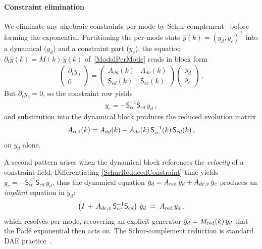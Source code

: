 \paragraph*{Constraint elimination}
We eliminate any algebraic constraints per mode by Schur complement~\cite{boydvandenberghe2004convex} before
forming the exponential. Partitioning the per-mode state
$\hat y(k) = (y_d, y_c)^{\mathsf{T}}$ into a dynamical ($y_d$) and
a constraint part ($y_c$), the equation
$\partial_t \hat y(k) = M(k)\, \hat y(k)$ of~\cref{ModalPerMode} reads
in block form
\begin{align}
  \begin{pmatrix} \partial_t y_d \\ 0 \end{pmatrix}
  = \begin{pmatrix} A_{dd}(k) & A_{dc}(k) \\
    \mathsf{S}_{cd}(k) & \mathsf{S}_{cc}(k) \end{pmatrix}
    \begin{pmatrix} y_d \\ y_c \end{pmatrix}
  \, .
  \label{ModalSchur}
\end{align}
But $\partial_t y_c = 0$, so the constraint row yields
\begin{align}
  y_c = -\mathsf{S}_{cc}^{-1} \mathsf{S}_{cd}\, y_d
  \, ,
  \label{SchurReducedConstraint}
\end{align}
and substitution into the dynamical block produces the reduced
evolution matrix
\begin{align}
  A_{\rm red}(k) = A_{dd}(k) - A_{dc}(k)\, \mathsf{S}_{cc}^{-1}(k)\, \mathsf{S}_{cd}(k)
  \, ,
  \label{SchurReducedMatrix}
\end{align}
on $y_d$ alone.%

A second pattern arises when the dynamical block references the
\emph{velocity} of a constraint field. Differentiating
\cref{SchurReducedConstraint} \wrt time yields
$\dot y_c = -\mathsf{S}_{cc}^{-1}\mathsf{S}_{cd}\,\dot y_d$, thus the
dynamical equation
$\dot y_d = A_{\rm red}\,y_d + A_{dc,v}\,\dot y_c$ produces an
\emph{implicit} equation in $\dot y_d$:
\begin{align}
  \left(I \,+\, A_{dc,v}\,\mathsf{S}_{cc}^{-1}\mathsf{S}_{cd}\right)\,
  \dot y_d
  \;=\; A_{\rm red}\, y_d
  \, ,
  \label{SchurImplicitVelocity}
\end{align}
which \TIDAL{} resolves per mode, recovering an explicit generator
$\dot y_d = M_{\rm red}(k)\,y_d$ that the Pad\'e exponential then acts
on. The Schur-complement
reduction is standard DAE
practice~\cite{brenan1996numerical,hairer1996ode2}.

